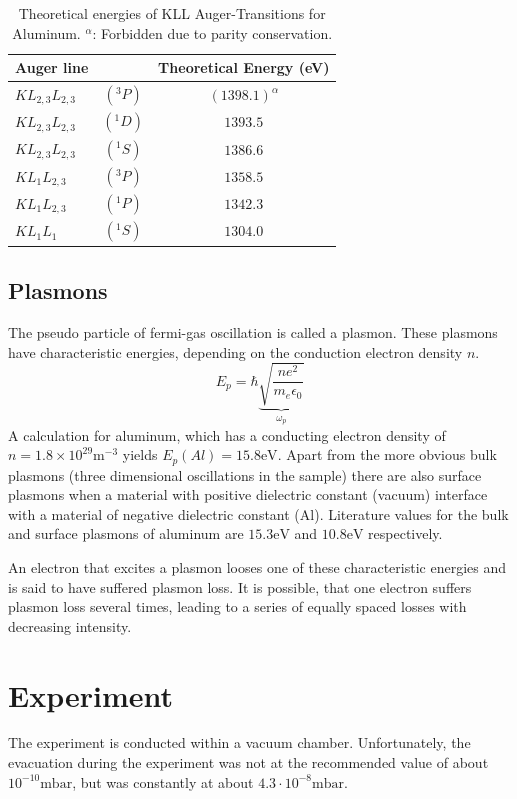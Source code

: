 \documentclass[a4paper]{scrartcl}
\numberwithin{equation}{section}
\numberwithin{figure}{section}
\numberwithin{table}{section}
\begin{document}
\begin{table}[!h]
\centering

\begin{tabular}{lcc}
\toprule
Auger line & & Theoretical Energy (eV) \\
\midrule
 $KL_{2,3}L_{2,3}$&$(^3P)$  & $(1398.1)^\alpha$ \\
$ KL_{2,3}L_{2,3}$&$(^1D) $ & $1393.5$ \\
$ KL_{2,3}L_{2,3}$&$(^1S)$ & $1386.6 $ \\
$ KL_{1}L_{2,3}$&$(^3P)$ & $1358.5$ \\
$ KL_{1}L_{2,3}$&$(^1P)$ & $1342.3$ \\
$ KL_{1}L_{1}$&$(^1S)$ & $1304.0$ \\
 \bottomrule

\end{tabular}
\caption{\small Theoretical energies \cite{paper} of KLL Auger-Transitions for Aluminum. $^\alpha$: Forbidden due to parity conservation. }
\label{kll}
\end{table}

\FloatBarrier

\subsection{Plasmons}
\label{sec:plasmonIntro}
The pseudo particle of fermi-gas oscillation is called a plasmon. These plasmons have characteristic energies, depending on the conduction electron density $n$. 
$$E_p = \hbar \underbrace{\sqrt{\frac{ne^2}{m_e \epsilon_0}}}_{\omega_p}$$
A calculation for aluminum, which has a conducting electron density of $n=1.8 \times 10^{29} \text{m}^{-3}$ yields $E_p(Al)=15.8 \text{eV}$.
Apart from the more obvious bulk plasmons (three dimensional oscillations in the sample) there are also surface plasmons when a material with positive dielectric constant (vacuum) interface with a material of negative dielectric constant (Al). Literature values \cite{paperplasmon} for the bulk and surface plasmons of aluminum are $15.3 \text{eV}$ and $10.8 \text{eV}$ respectively.

An electron that excites a plasmon looses one of these characteristic energies and is said to have suffered plasmon loss. It is possible, that one electron suffers plasmon loss several times, leading to a series of equally spaced losses with decreasing intensity.


\section{Experiment}
The experiment is conducted within a vacuum chamber. Unfortunately, the evacuation during the experiment was not at the recommended value of about $10^{-10} \text{mbar}$, but was constantly at about $4.3 \cdot 10^{-8}\text{mbar}$. 
\end{document}
